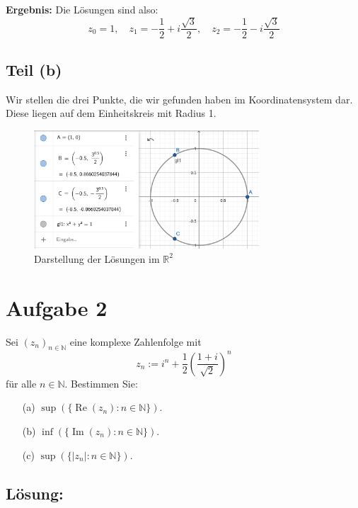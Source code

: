 \documentclass[11pt]{article}
\begin{document}
\textbf{Ergebnis:} Die Lösungen sind also:
\[
z_0 = 1, \quad z_1 = -\frac{1}{2} + i\frac{\sqrt{3}}{2}, \quad z_2 = -\frac{1}{2} - i\frac{\sqrt{3}}{2}
\]

\clearpage

\subsection*{Teil (b)}

Wir stellen die drei Punkte, die wir gefunden haben im Koordinatensystem dar. Diese liegen auf dem Einheitskreis
mit Radius 1.

\begin{figure}[h]
    \centering
    \includegraphics[width=0.75\textwidth]{img/a1_4_1.png}
    \caption{Darstellung der Lösungen im \(\mathbb{R}^2\)}
\end{figure}

\section*{Aufgabe 2}

Sei \( (z_n)_{n \in \mathbb{N}} \) eine komplexe Zahlenfolge mit
\[
z_n := i^n + \frac{1}{2} \left( \frac{1 + i}{\sqrt{2}} \right)^n
\]
für alle \( n \in \mathbb{N} \). Bestimmen Sie:

\begin{enumerate}
    \item[(a)] \( \sup(\{\operatorname{Re}(z_n) : n \in \mathbb{N}\}) \).
    \item[(b)] \( \inf(\{\operatorname{Im}(z_n) : n \in \mathbb{N}\}) \).
    \item[(c)] \( \sup(\{|z_n| : n \in \mathbb{N}\}) \).
\end{enumerate}

\subsection*{Lösung:}
\end{document}
